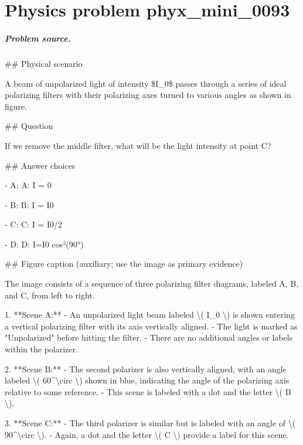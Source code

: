 
\chapter{Physics problem phyx\_mini\_0093}
\label{ch:PhyXMiniProblems_problem_phyx_mini_0093}

\paragraph{Problem source.}
\#\# Physical scenario

A beam of unpolarized light of intensity \$I\_0\$ passes through a series of ideal polarizing filters with their polarizing axes turned to various angles as shown in figure.

\#\# Question

If we remove the middle filter, what will be the light intensity at point C?

\#\# Answer choices

- A: A: I = 0

- B: B: I = I0

- C: C: I = I0/2

- D: D: I=I0 cos²(90°)

\#\# Figure caption (auxiliary; use the image as primary evidence)

The image consists of a sequence of three polarizing filter diagrams, labeled A, B, and C, from left to right. 

1. **Scene A:**
   - An unpolarized light beam labeled \textbackslash{}( I\_0 \textbackslash{}) is shown entering a vertical polarizing filter with its axis vertically aligned.
   - The light is marked as "Unpolarized" before hitting the filter.
   - There are no additional angles or labels within the polarizer.

2. **Scene B:**
   - The second polarizer is also vertically aligned, with an angle labeled \textbackslash{}( 60\textasciicircum{}\textbackslash{}circ \textbackslash{}) shown in blue, indicating the angle of the polarizing axis relative to some reference.
   - This scene is labeled with a dot and the letter \textbackslash{}( B \textbackslash{}).

3. **Scene C:**
   - The third polarizer is similar but is labeled with an angle of \textbackslash{}( 90\textasciicircum{}\textbackslash{}circ \textbackslash{}).
   - Again, a dot and the letter \textbackslash{}( C \textbackslash{}) provide a label for this scene.

